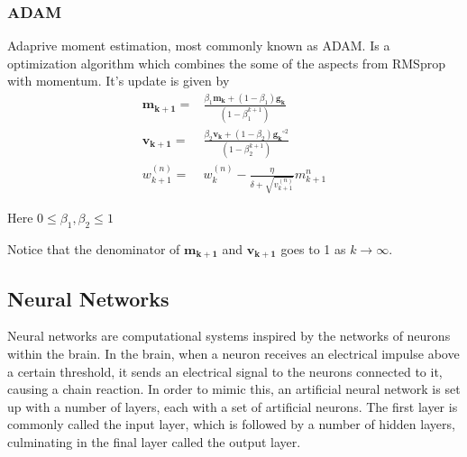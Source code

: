 \documentclass{article}
\theoremstyle{definition}
\begin{document}
\subsubsection{ADAM}
Adaprive moment estimation, most commonly known as ADAM. Is a optimization algorithm which combines the some of the aspects from RMSprop with momentum. It's update is given by
\begin{align*}
    \mathbf{m_{k+1}} =& \frac{\beta_1 \mathbf{m_k} + (1- \beta_1) \mathbf{g_k}}{\left(1 - \beta_1^{k+1}\right)}\\
    \mathbf{v_{k+1}} =& \frac{\beta_2 \mathbf{v_k} + (1-\beta_2) \mathbf{g_k}^{\circ 2}}{\left(1-\beta_2^{k+1}\right)}\\
    w_{k+1}^{(n)} =& w_k^{(n)} - \frac{\eta}{\delta + \sqrt{v_{k+1}^{(n)}}} m_{k+1}^{n}
\end{align*}

Here $0 \leq \beta_1,\beta_2 \leq 1$ 
\par
\vspace{1mm}
Notice that the denominator of $\mathbf{m_{k+1}}$ and $\mathbf{v_{k+1}}$ goes to 1 as $k \to \infty$.

\subsection{Neural Networks}

Neural networks are computational systems inspired by the networks of neurons within the brain. In the brain, when a neuron receives an electrical impulse above a certain threshold, it sends an electrical signal to the neurons connected to it, causing a chain reaction. In order to mimic this, an artificial neural network is set up with a number of layers, each with a set of artificial neurons. The first layer is commonly called the input layer, which is followed by a number of hidden layers, culminating in the final layer called the output layer.
\end{document}
